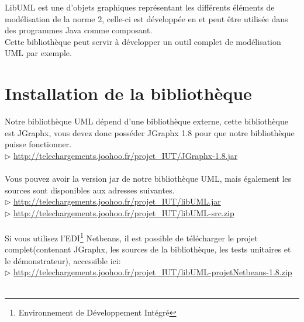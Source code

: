 \documentclass[12pt,a4paper,openany]{report}
\begin{document}
	\maketitle
	\newpage
	\tableofcontents
	\vspace{20px}
	LibUML est une 
	d'objets graphiques représentant les différents éléments de modélisation de la norme 
	2, celle-ci est développée en 
	et peut être utilisée dans des programmes Java comme composant. \\
	Cette bibliothèque peut servir à développer un outil complet de modélisation UML par exemple.
	\newpage
	\chapter{Installation de la bibliothèque}
		Notre bibliothèque UML dépend d'une bibliothèque externe, cette bibliothèque est JGraphx, vous devez donc posséder JGraphx 1.8 pour que notre bibliothèque puisse fonctionner. \\
	$\rhd$ \url{http://telechargements.joohoo.fr/projet\_IUT/JGraphx-1.8.jar}\\\\
	Vous pouvez avoir la version jar de notre bibliothèque UML, mais également les sources sont disponibles aux adresses suivantes.\\
	$\rhd$ \url{http://telechargements.joohoo.fr/projet\_IUT/libUML.jar}\\
	$\rhd$ \url{http://telechargements.joohoo.fr/projet\_IUT/libUML-src.zip}\\\\
	Si vous utilisez l'EDI\footnote{Environnement de Développement Intégré} Netbeans, il est possible de télécharger le projet complet(contenant JGraphx, les sources de la 
	bibliothèque, les tests unitaires et le démonstrateur), accessible ici:\\
	$\rhd$ \url{http://telechargements.joohoo.fr/projet\_IUT/libUML-projetNetbeans-1.8.zip}\\\\
\end{document}
